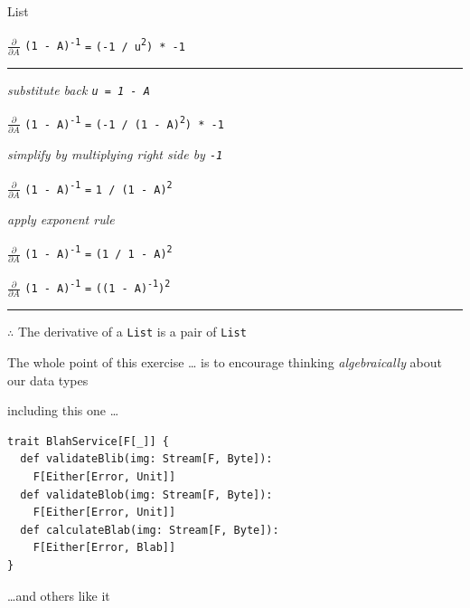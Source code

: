 \begin{frame}{List}

$\frac{\partial}{\partial A}$ {\lstinline{(1 - A)}\textsuperscript{\lstinline{-1}}} \lstinline{=} \lstinline{(-1 / u}\textsuperscript{\lstinline{2}}\lstinline{) * -1}

\par\noindent\rule{\textwidth}{0.4pt}

\emph{\tiny{substitute back \lstinline{u = 1 - A}}}

$\frac{\partial}{\partial A}$ {\lstinline{(1 - A)}\textsuperscript{\lstinline{-1}}} \lstinline{=} \lstinline{(-1 / (1 - A)}\textsuperscript{\lstinline{2}}\lstinline{) * -1}

\emph{\tiny{simplify by multiplying right side by \lstinline{-1}}}

$\frac{\partial}{\partial A}$ {\lstinline{(1 - A)}\textsuperscript{\lstinline{-1}}} \lstinline{=} \lstinline{1 / (1 - A)}\textsuperscript{\lstinline{2}}

\emph{\tiny{apply exponent rule}}

$\frac{\partial}{\partial A}$ {\lstinline{(1 - A)}\textsuperscript{\lstinline{-1}}} \lstinline{=} \lstinline{(1 / 1 - A)}\textsuperscript{\lstinline{2}}

$\frac{\partial}{\partial A}$ {\lstinline{(1 - A)}\textsuperscript{\lstinline{-1}}} \lstinline{=} \lstinline{((1 - A)}\textsuperscript{\lstinline{-1}}\lstinline{)}\textsuperscript{\lstinline{2}}

\par\noindent\rule{\textwidth}{0.4pt}

{$\therefore$} The derivative of a \lstinline{List} is a pair of \lstinline{List}

\end{frame}

\begin{frame}
\begin{block}{The whole point of this exercise \ldots}
is to encourage thinking \emph{algebraically} about our data types
\end{block}
\end{frame}

\begin{frame}[fragile]
\begin{block}{including this one \ldots}
\begin{lstlisting}[style=scala]
trait BlahService[F[_]] {
  def validateBlib(img: Stream[F, Byte]):
    F[Either[Error, Unit]]
  def validateBlob(img: Stream[F, Byte]):
    F[Either[Error, Unit]]
  def calculateBlab(img: Stream[F, Byte]):
    F[Either[Error, Blab]]
}
\end{lstlisting}
\end{block}
\end{frame}

\begin{frame}
\begin{center}
\ldots and others like it
\end{center}
\end{frame}
